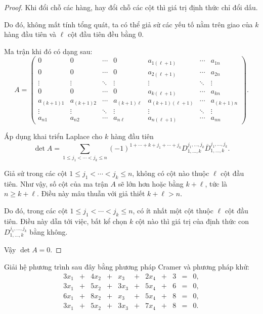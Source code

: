 \begin{proof}
    Khi đổi chỗ các hàng, hay đổi chỗ các cột thì giá trị định thức chỉ đổi dấu.
    
    Do đó, không mất tính tổng quát, ta có thể giả sử các yếu tố nằm trên giao của $k$ hàng đầu tiên và $\ell$ cột đầu tiên đều bằng 0.
    
    Ma trận khi đó có dạng sau:
    \[
        A=
        \begin{pmatrix}
            0          & 0          & \cdots & 0             & a_{1(\ell+1)}     & \cdots & a_{1n}     \\
            0          & 0          & \cdots & 0             & a_{2(\ell+1)}     & \cdots & a_{2n}     \\
            \vdots     & \vdots     & \ddots & \vdots        & \vdots            & \ddots & \vdots     \\
            0          & 0          & \cdots & 0             & a_{k(\ell+1)}     & \cdots & a_{kn}     \\
            a_{(k+1)1} & a_{(k+1)2} & \cdots & a_{(k+1)\ell} & a_{(k+1)(\ell+1)} & \cdots & a_{(k+1)n} \\
            \vdots     & \vdots     & \ddots & \vdots        & \vdots            & \ddots & \vdots     \\
            a_{n1}     & a_{n2}     & \cdots & a_{n\ell}     & a_{n(\ell+1)}     & \cdots & a_{nn}
        \end{pmatrix}.
    \]
    
    Áp dụng khai triển Laplace cho $k$ hàng đầu tiên
    \[
        \det A = \sum_{1\le j_{1} < \cdots < j_{k}\le n}{(-1)}^{1+\cdots+k+j_{1}+\cdots+j_{k}}D_{1,\ldots,k}^{j_{1},\ldots,j_{k}}\overline{D}_{1,\ldots,k}^{j_{1},\ldots,j_{k}}.
    \]
    
    Giả sử trong các cột $1\le j_{1} < \cdots < j_{k}\le n$, không có cột nào thuộc $\ell$ cột đầu tiên. Như vậy, số cột của ma trận $A$ sẽ lớn hơn hoặc bằng $k + \ell$, tức là $n \ge k + \ell$. Điều này mâu thuẫn với giả thiết $k + \ell > n$.
    
    Do đó, trong các cột $1\le j_{1} < \cdots < j_{k}\le n$, có ít nhất một cột thuộc $\ell$ cột đầu tiên. Điều này dẫn tới việc, bất kể chọn $k$ cột nào thì giá trị của định thức con  $D^{j_{1},\ldots,j_{k}}_{1,\ldots,k}$ bằng không.
    
    Vậy $\det A = 0$.
\end{proof}

\begin{exercise}
    Giải hệ phương trình sau đây bằng phương pháp Cramer và phương pháp khử:
    \[
        \begin{array}{ccccccccccc}
            3x_{1} & + & 4x_{2} & + & x_{3}  & + & 2x_{4} & + & 3 & = & 0, \\
            3x_{1} & + & 5x_{2} & + & 3x_{3} & + & 5x_{4} & + & 6 & = & 0, \\
            6x_{1} & + & 8x_{2} & + & x_{3}  & + & 5x_{4} & + & 8 & = & 0, \\
            3x_{1} & + & 5x_{2} & + & 3x_{3} & + & 7x_{4} & + & 8 & = & 0.
        \end{array}
    \]
\end{exercise}

